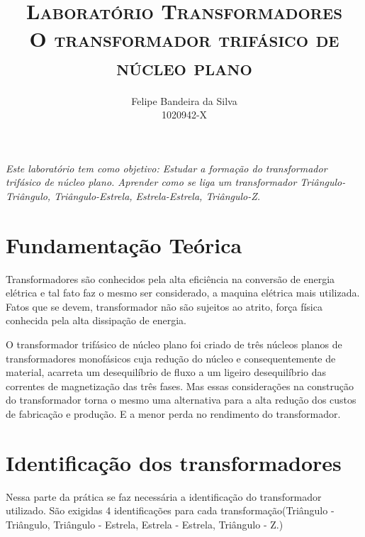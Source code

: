 \documentclass[paper=a4, fontsize=11pt]{article}
\title{\textsc{Laboratório Transformadores\\O transformador trifásico de núcleo plano}}
\author{Felipe Bandeira da Silva\\1020942-X}
\begin{document}
\maketitle


\textit{Este laboratório tem como objetivo: Estudar a formação do transformador trifásico de núcleo plano. Aprender como se liga um transformador Triângulo-Triângulo, Triângulo-Estrela, Estrela-Estrela, Triângulo-Z.}

\newpage

\tableofcontents

\newpage

\listoffigures

\newpage

\listoftables

\newpage
\section{Fundamentação Teórica}

Transformadores são conhecidos pela alta eficiência na conversão de energia elétrica
e tal fato faz o mesmo ser considerado, a maquina elétrica mais utilizada. Fatos
que se devem, transformador não são sujeitos ao atrito, força física conhecida pela
alta dissipação de energia. 

O transformador trifásico de núcleo plano foi criado de
três núcleos planos de transformadores monofásicos cuja redução do núcleo e consequentemente
de material, acarreta um desequilíbrio de fluxo a um ligeiro desequilíbrio das correntes
de magnetização das três fases. Mas essas considerações na construção do transformador
torna o mesmo uma alternativa para a alta redução dos custos de fabricação e produção.
E a menor perda no rendimento do transformador.

\section{Identificação dos transformadores}

Nessa parte da prática se faz necessária a identificação do transformador utilizado.
São exigidas 4 identificações para cada transformação(Triângulo - Triângulo,
Triângulo - Estrela, Estrela - Estrela, Triângulo - Z.)
\end{document}
